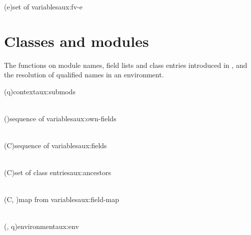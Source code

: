 \begin{auxfunction}{\fvE(e)}{set of variables}{aux:fv-e}

\end{auxfunction}

\section{Classes and modules}
\label{sec:mf-classes}

The functions on module names, field lists and class entries introduced in , and
the resolution of qualified names in an environment.

\begin{auxfunction}{\submods(q)}{context}{aux:submods}

\begin{align*}

\end{align*}
\end{auxfunction}

\begin{auxfunction}{\ownFields(\phi)}{sequence of variables}{aux:own-fields}

\begin{align*}

\end{align*}
\end{auxfunction}

\begin{auxfunction}{\fields(C)}{sequence of variables}{aux:fields}

\begin{align*}

\end{align*}
\end{auxfunction}

\begin{auxfunction}{\ancestors(C)}{set of class entries}{aux:ancestors}

\begin{align*}

\end{align*}
\end{auxfunction}

\begin{auxfunction}{\fieldMap(C, )}{map from variables}{aux:field-map}

\begin{align*}

\end{align*}
\end{auxfunction}

\begin{auxfunction}{\env(\rho, q)}{environment}{aux:env}

\begin{align*}

\end{align*}
\end{auxfunction}

